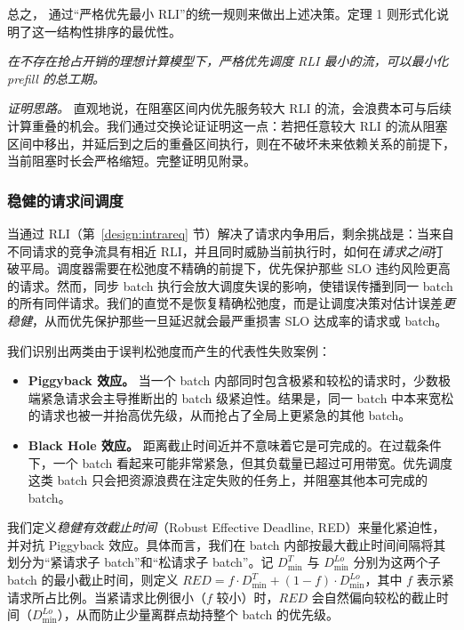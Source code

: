 总之，\sys{} 通过“严格优先最小 RLI”的统一规则来做出上述决策。定理 1 则形式化说明了这一结构性排序的最优性。

 \emph{在不存在抢占开销的理想计算模型下，严格优先调度 RLI 最小的流，可以最小化 prefill 的总工期。}

\emph{证明思路。} 直观地说，在阻塞区间内优先服务较大 RLI 的流，会浪费本可与后续计算重叠的机会。我们通过交换论证证明这一点：若把任意较大 RLI 的流从阻塞区间中移出，并延后到之后的重叠区间执行，则在不破坏未来依赖关系的前提下，当前阻塞时长会严格缩短。完整证明见附录。

\subsubsection{稳健的请求间调度}\label{design:interreq}

当通过 RLI（第~\ref{design:intrareq} 节）解决了请求内争用后，剩余挑战是：当来自不同请求的竞争流具有相近 RLI，并且同时威胁当前执行时，如何在\emph{请求之间}打破平局。调度器需要在松弛度不精确的前提下，优先保护那些 SLO 违约风险更高的请求。然而，同步 batch 执行会放大调度失误的影响，使错误传播到同一 batch 的所有同伴请求。我们的直觉不是恢复精确松弛度，而是让调度决策对估计误差\emph{更稳健}，从而优先保护那些一旦延迟就会最严重损害 SLO 达成率的请求或 batch。

我们识别出两类由于误判松弛度而产生的代表性失败案例：
\begin{itemize}[leftmargin=*]
    \item \textbf{Piggyback 效应。} 当一个 batch 内部同时包含极紧和较松的请求时，少数极端紧急请求会主导推断出的 batch 级紧迫性。结果是，同一 batch 中本来宽松的请求也被一并抬高优先级，从而抢占了全局上更紧急的其他 batch。
    \item \textbf{Black Hole 效应。} 距离截止时间近并不意味着它是可完成的。在过载条件下，一个 batch 看起来可能非常紧急，但其负载量已超过可用带宽。优先调度这类 batch 只会把资源浪费在注定失败的任务上，并阻塞其他本可完成的 batch。
\end{itemize}

我们定义\emph{稳健有效截止时间}（Robust Effective Deadline, RED）来量化紧迫性，并对抗 Piggyback 效应。具体而言，我们在 batch 内部按最大截止时间间隔将其划分为“紧请求子 batch”和“松请求子 batch”。记 $D^T_{\text{min}}$ 与 $D^{Lo}_{\text{min}}$ 分别为这两个子 batch 的最小截止时间，则定义 $RED = f \cdot D^T_{\text{min}} + (1-f) \cdot D^{Lo}_{\text{min}}$，其中 $f$ 表示紧请求所占比例。当紧请求比例很小（$f$ 较小）时，$RED$ 会自然偏向较松的截止时间（$D^{Lo}_{\min}$），从而防止少量离群点劫持整个 batch 的优先级。

